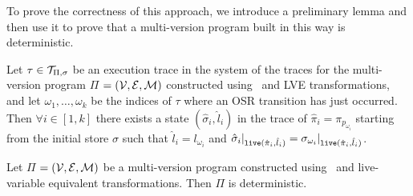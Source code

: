 \noindent To prove the correctness of this approach, we introduce a preliminary lemma and then use it to prove that a multi-version program built in this way is deterministic.

\begin{lemma}
\label{le:comp-lemma}
Let $\tau\in{\cal T}_{\Pi,\sigma}$ be an execution trace in the system of the traces for the multi-version program $\Pi$ $=({\cal V}, {\cal E}, {\cal M})$ constructed using \dopasses\ and LVE transformations, and let $\omega_1,\ldots,\omega_k$ be the indices of $\tau$ where an OSR transition has just occurred. Then $\forall i\in[1,k]$ there exists a state $(\hat{\sigma}_i,\hat{l}_i)$ in the trace of $\hat{\pi}_i=\pi_{p_{\omega_{i}}}$ starting from the initial store $\sigma$ such that $\hat{l}_i=l_{\omega_i}$ and $\hat{\sigma}_i\vert_{\text{${\tt live}$}(\hat{\pi}_i,\hat{l}_i)}=\sigma_{\omega_i}\vert_{\text{${\tt live}$}(\hat{\pi}_i,\hat{l}_i)}$.
\end{lemma}
\begin{myproof}
\missing
\end{myproof}

\begin{theorem}
\label{th:mv-prog-determ}
Let $\Pi$ $=({\cal V}, {\cal E}, {\cal M})$ be a multi-version program constructed using \dopasses\ and live-variable equivalent transformations. Then $\Pi$ is deterministic.
\end{theorem}

